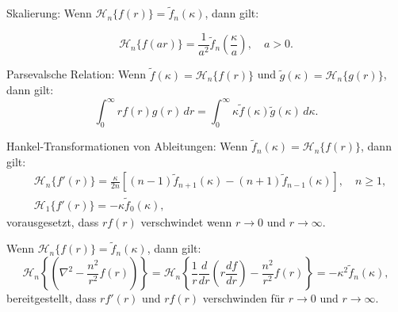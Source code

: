 \begin{satz}{Skalierung:}
	Wenn $\mathscr{H}_n\{f(r)\}=\tilde{f}_n(\kappa)$, dann gilt:
	
	\begin{equation*}
		\mathscr{H}_n\{f(ar)\}=\frac{1}{a^{2}}\tilde{f}_n \left(\frac{\kappa}{a}\right), \quad a>0.
	\end{equation*}
\end{satz}

\begin{satz}{Parsevalsche Relation:}
%
Wenn $\tilde{f}(\kappa)=\mathscr{H}_n\{f(r)\}$ und
$\tilde{g}(\kappa)=\mathscr{H}_n\{g(r)\}$, dann gilt:
\begin{equation*}
	\int_{0}^{\infty}rf(r)g(r) \, dr = \int_{0}^{\infty}\kappa\tilde{f}(\kappa)\tilde{g}(\kappa) \, d\kappa.
\end{equation*}
\end{satz}

\begin{satz}{Hankel-Transformationen von Ableitungen:}
%
Wenn $\tilde{f}_n(\kappa)=\mathscr{H}_n\{f(r)\}$, dann gilt:
\begin{align*}
	&\mathscr{H}_n\{f'(r)\}=\frac{\kappa}{2n}\left[(n-1)\tilde{f}_{n+1}(\kappa)-(n+1)\tilde{f}_{n-1}(\kappa)\right], \quad n\geq1, \\
	&\mathscr{H}_1\{f'(r)\}=-\kappa \tilde{f}_0(\kappa),
\end{align*}
vorausgesetzt, dass $rf(r)$ verschwindet wenn $r\to0$ und $r\to\infty$.
\end{satz}

\begin{satz}
%
Wenn $\mathscr{H}_n\{f(r)\}=\tilde{f}_n(\kappa)$, dann gilt:
\begin{equation*}
	\mathscr{H}_n \left\{ \left( \nabla^2 - \frac{n^2}{r^2} f(r)\right)\right\}
	=
	\mathscr{H}_n\left\{\frac{1}{r}\frac{d}{dr}\left(r\frac{df}{dr}\right) - \frac{n^2}{r^2}f(r)\right\}=-\kappa^2\tilde{f}_{n}(\kappa),
\end{equation*}
bereitgestellt, dass $rf'(r)$ und $rf(r)$ verschwinden für $r\to0$ und
$r\to\infty$.
\end{satz}
